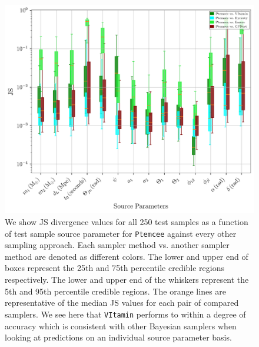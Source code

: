 \begin{figure}
    \includegraphics[width=\columnwidth]{figures/JS_IndiPar_ptemcee.png}
    \caption[JS divergences of individual source parameters for \texttt{Ptemcee} against all other approaches.]{\label{fig:JS_indi_par_ptemcee} We show JS divergence values for all 250 test samples as a function of test sample source parameter for \texttt{Ptemcee} against every other sampling approach. Each sampler method vs. another sampler method are denoted as different colors. The lower and upper end of boxes represent the 25th and 75th percentile credible regions respectively. The lower and upper end of the whiskers represent the 5th and 95th percentile credible regions. The orange lines are representative of the median JS values for each pair of compared samplers. We see here that \texttt{VItamin} performs to within a degree of accuracy which is consistent with other Bayesian samplers when looking at predictions on an individual source parameter basis.}
\end{figure}



